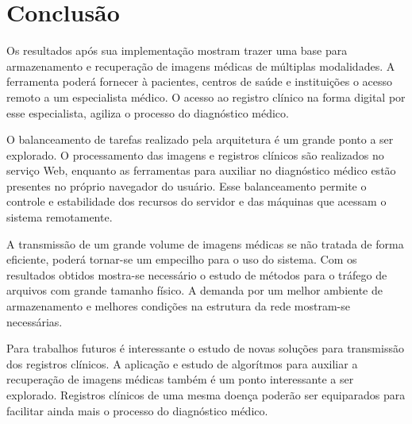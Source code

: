\section{\esp Conclusão}

Os resultados após sua implementação mostram trazer uma base para armazenamento e recuperação de imagens médicas de múltiplas modalidades. A ferramenta poderá fornecer à pacientes, centros de saúde e instituições o acesso remoto a um especialista médico. O acesso ao registro clínico na forma digital por esse especialista, agiliza o processo do diagnóstico médico.

O balanceamento de tarefas realizado pela arquitetura é um grande ponto a ser explorado. O processamento das imagens e registros clínicos são realizados no serviço Web, enquanto as ferramentas para auxiliar no diagnóstico médico estão presentes no próprio navegador do usuário. Esse balanceamento permite o controle e estabilidade dos recursos do servidor e das máquinas que acessam o sistema remotamente.

A transmissão de um grande volume de imagens médicas se não tratada de forma eficiente, poderá tornar-se um empecilho para o uso do sistema. Com os resultados obtidos mostra-se necessário o estudo de métodos para o tráfego de arquivos com grande tamanho físico. A demanda por um melhor ambiente de armazenamento e melhores condições na estrutura da rede mostram-se necessárias.

Para trabalhos futuros é interessante o estudo de novas soluções para transmissão dos registros clínicos. A aplicação e estudo de algorítmos para auxiliar a recuperação de imagens médicas também é um ponto interessante a ser explorado. Registros clínicos de uma mesma doença poderão ser equiparados para facilitar ainda mais o processo do diagnóstico médico.


% 
